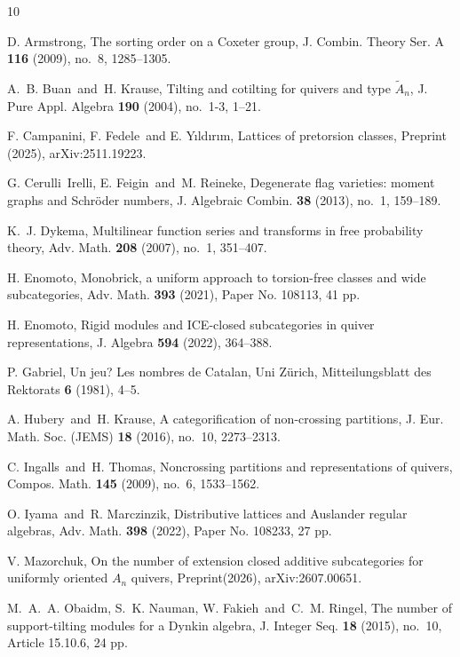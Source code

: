 \documentclass[a4paper]{amsart}
\theoremstyle{plain}
\theoremstyle{definition}
\theoremstyle{remark}
\numberwithin{equation}{section}
\begin{document}
\begin{thebibliography}{10}

 D. Armstrong, The sorting order on a Coxeter group,
  J. Combin. Theory Ser. A {\bf 116} (2009), no.~8, 1285--1305.

 A.~B. Buan\ and\ H. Krause, Tilting and cotilting for
  quivers and type $\tilde A_n$, J. Pure Appl. Algebra {\bf 190}
  (2004), no.~1-3, 1--21.

 F. Campanini, F. Fedele\ and E.  Yıldırım, Lattices
  of pretorsion classes, Preprint (2025), arXiv:2511.19223.

 G. Cerulli~Irelli, E. Feigin\ and\ M. Reineke,
  Degenerate flag varieties: moment graphs and Schr\"{o}der numbers,
  J. Algebraic Combin. {\bf 38} (2013), no.~1, 159--189.

 K.~J. Dykema, Multilinear function series and
  transforms in free probability theory, Adv. Math. {\bf 208} (2007),
  no.~1, 351--407.

 H. Enomoto, Monobrick, a uniform approach to
  torsion-free classes and wide subcategories, Adv. Math. {\bf 393}
  (2021), Paper No. 108113, 41 pp.

 H. Enomoto, Rigid modules and ICE-closed
  subcategories in quiver representations, J. Algebra {\bf 594}
  (2022), 364--388.
  
 P. Gabriel, Un jeu?  Les nombres de Catalan,
  Uni Z\"urich, Mitteilungsblatt des Rektorats {\bf 6} (1981), 4--5.

 A. Hubery\ and\ H. Krause, A categorification of
  non-crossing partitions, J. Eur. Math. Soc. (JEMS) {\bf 18} (2016),
  no.~10, 2273--2313.
  
 C. Ingalls\ and\ H. Thomas, Noncrossing partitions
  and representations of quivers, Compos. Math. {\bf 145} (2009),
  no.~6, 1533--1562.

 O. Iyama\ and\ R. Marczinzik, Distributive lattices
  and Auslander regular algebras, Adv. Math. {\bf 398} (2022), Paper
  No. 108233, 27 pp.

 V. Mazorchuk, On the number of extension closed
  additive subcategories for uniformly oriented $A_n$ quivers,
  Preprint(2026), arXiv:2607.00651.
  
 M.~A.~A. Obaidm, S.~K. Nauman, W. Fakieh\ and\
  C.~M. Ringel, The number of support-tilting modules for a Dynkin
  algebra, J. Integer Seq. {\bf 18} (2015), no.~10, Article 15.10.6,
  24 pp.
  

\end{thebibliography}
\end{document}
